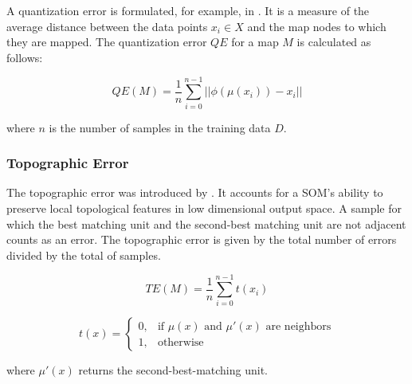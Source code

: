A quantization error is formulated, for example, in \cite{wandeto2019quantization}. It is a measure of the average distance between the data points $x_i \in X$ and the map nodes to which they are mapped. The quantization error $QE$ for a map $M$ is calculated as follows:

$$
 QE(M) = \frac{1}{n}\sum_{i=0}^{n-1} ||\phi(\mu(x_i)) - x_i ||
$$

where $n$ is the number of samples in the training data $D$.

\subsubsection*{Topographic Error}

The topographic error was introduced by \cite{kiviluoto1996topology}. It accounts for a SOM's ability to preserve local topological features in low dimensional output space. A sample for which the best matching unit and the second-best matching unit are not adjacent counts as an error. The topographic error is given by the total number of errors divided by the total of samples.

$$
    TE(M) = \frac{1}{n}\sum_{i=0}^{n-1}t(x_i)
$$

$$
    t(x) = \begin{cases}
			0, & \text{if $\mu(x)$ and $\mu'(x)$ are neighbors}\\
            1, & \text{otherwise}
		 \end{cases}
$$

where $\mu'(x)$ returns the second-best-matching unit.